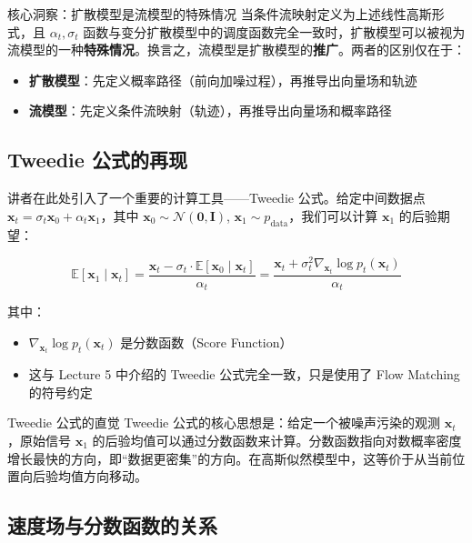 \documentclass[a4paper]{article}
\begin{document}
\begin{importantbox}{核心洞察：扩散模型是流模型的特殊情况}
当条件流映射定义为上述线性高斯形式，且 $\alpha_t, \sigma_t$ 函数与变分扩散模型中的调度函数完全一致时，扩散模型可以被视为流模型的一种\textbf{特殊情况}。换言之，流模型是扩散模型的\textbf{推广}。两者的区别仅在于：
\begin{itemize}
    \item \textbf{扩散模型}：先定义概率路径（前向加噪过程），再推导出向量场和轨迹
    \item \textbf{流模型}：先定义条件流映射（轨迹），再推导出向量场和概率路径
\end{itemize}
\end{importantbox}

\subsection{Tweedie 公式的再现}

讲者在此处引入了一个重要的计算工具——Tweedie 公式。给定中间数据点 $\mathbf{x}_t = \sigma_t \mathbf{x}_0 + \alpha_t \mathbf{x}_1$，其中 $\mathbf{x}_0 \sim \mathcal{N}(\mathbf{0}, \mathbf{I})$, $\mathbf{x}_1 \sim p_{\text{data}}$，我们可以计算 $\mathbf{x}_1$ 的后验期望：

$$\mathbb{E}[\mathbf{x}_1 \mid \mathbf{x}_t] = \frac{\mathbf{x}_t - \sigma_t \cdot \mathbb{E}[\mathbf{x}_0 \mid \mathbf{x}_t]}{\alpha_t} = \frac{\mathbf{x}_t + \sigma_t^2 \nabla_{\mathbf{x}_t} \log p_t(\mathbf{x}_t)}{\alpha_t}$$

其中：
\begin{itemize}
    \item $\nabla_{\mathbf{x}_t} \log p_t(\mathbf{x}_t)$ 是分数函数（Score Function）
    \item 这与 Lecture 5 中介绍的 Tweedie 公式完全一致，只是使用了 Flow Matching 的符号约定
\end{itemize}

\begin{knowledgebox}{Tweedie 公式的直觉}
Tweedie 公式的核心思想是：给定一个被噪声污染的观测 $\mathbf{x}_t$，原始信号 $\mathbf{x}_1$ 的后验均值可以通过分数函数来计算。分数函数指向对数概率密度增长最快的方向，即``数据更密集''的方向。在高斯似然模型中，这等价于从当前位置向后验均值方向移动。
\end{knowledgebox}

\subsection{速度场与分数函数的关系}
\end{document}
